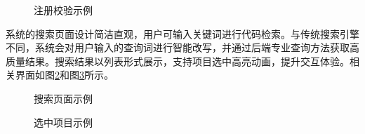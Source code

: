 \documentclass[UTF8,a4paper,12pt]{ctexart}
\numberwithin{equation}{section}
\begin{document}
\begin{figure}[H]
	\caption{注册校验示例}
	\label{registercheckpage}
\end{figure}
系统的搜索页面设计简洁直观，用户可输入关键词进行代码检索。与传统搜索引擎不同，系统会对用户输入的查询词进行智能改写，并通过后端专业查询方法获取高质量结果。搜索结果以列表形式展示，支持项目选中高亮动画，提升交互体验。相关界面如图\ref{searchpage}和图\ref{select}所示。
\begin{figure}[H]
	\caption{搜索页面示例}
	\label{searchpage}
\end{figure}
\begin{figure}[H]
	\caption{选中项目示例}
	\label{select}
\end{figure}
\end{document}
